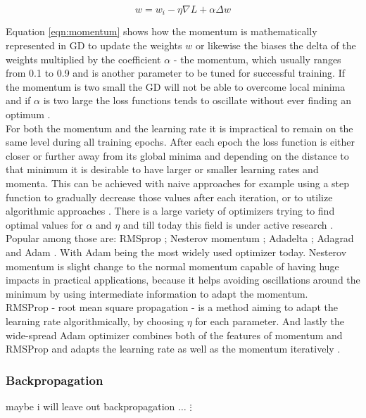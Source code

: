 \begin{equation}
 w = w_i - \eta \nabla L + \alpha \Delta w
 \label{eqn:momentum}
\end{equation}


Equation \ref{eqn:momentum} shows how the momentum is mathematically represented in GD to update the weights
$w$ or likewise the biases the delta of the weights multiplied by the coefficient $\alpha$ - the momentum,
which usually ranges from 0.1 to 0.9 and is another parameter to be tuned for successful training. If the
momentum is two small the GD will not be able to overcome local minima and if $\alpha$ is two large the loss
functions tends to oscillate without ever finding an optimum \cite{lecun2015deep}. \\ For both the
momentum and the learning rate it is impractical to remain on the same level during all training epochs. After
each epoch the loss function is either closer or further away from its global minima and depending on the
distance to that minimum it is desirable to have larger or smaller learning rates and momenta. This can be
achieved with naive approaches for example using a step function to gradually decrease those values after each
iteration, or to utilize algorithmic approaches \cite{michie1994machine}. There is a large variety of
optimizers trying to find optimal values for $\alpha$ and $\eta$ and till today this field is under active
research \cite{goodfellow2016deep}. Popular among those are: RMSprop \cite{hinton2012neural}; Nesterov
momentum \cite{dozat2016incorporating}; Adadelta \cite{zeiler2012adadelta}; Adagrad \cite{ruder2016overview}
and Adam \cite{kingma2014adam}. With Adam being the most widely used optimizer today. Nesterov momentum is
slight change to the
normal momentum capable of having huge impacts in practical applications, because it helps avoiding oscillations around the minimum by using intermediate information to adapt the momentum. \\
RMSProp - root mean square propagation - is a method aiming to adapt the learning rate algorithmically, by
choosing $\eta$ for each parameter. And lastly the wide-spread Adam optimizer combines both of the features of
momentum and RMSProp and adapts the learning rate as well as the momentum iteratively \cite{kingma2014adam}.


\subsubsection{Backpropagation}
maybe i will leave out backpropagation
$\hdots$
$\vdots$

